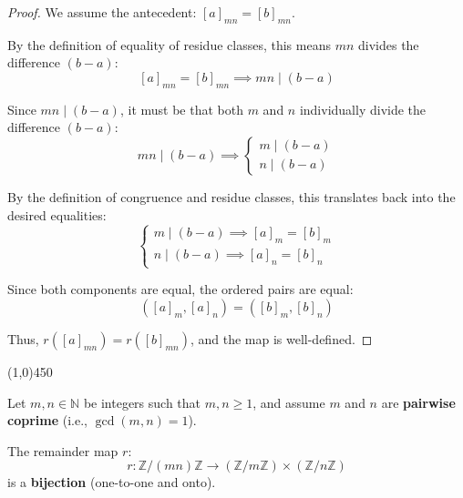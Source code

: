 \begin{proof}
    We assume the antecedent: $[a]_{mn} = [b]_{mn}$.
    
    By the definition of equality of residue classes, this means $mn$ divides the difference $(b - a)$:
    $$[a]_{mn} = [b]_{mn} \implies mn \mid (b - a)$$
    
    Since $mn \mid (b - a)$, it must be that both $m$ and $n$ individually divide the difference $(b - a)$:
    $$mn \mid (b - a) \implies \begin{cases} m \mid (b - a) \\ n \mid (b - a) \end{cases}$$
    
    By the definition of congruence and residue classes, this translates back into the desired equalities:
    $$\begin{cases} m \mid (b - a) \implies [a]_m = [b]_m \\ n \mid (b - a) \implies [a]_n = [b]_n \end{cases}$$
    
    Since both components are equal, the ordered pairs are equal:
    $$([a]_m, [a]_n) = ([b]_m, [b]_n)$$
    
    Thus, $r([a]_{mn}) = r([b]_{mn})$, and the map is well-defined.
\end{proof}

\begin{center}
    \vspace{10pt}
    \line(1,0){450}
    \vspace{25pt}
\end{center}


\begin{theorem}
    Let $m, n \in \mathbb{N}$ be integers such that $m, n \ge 1$, and assume $m$ and $n$ are \textbf{pairwise coprime} (i.e., $\gcd(m, n) = 1$).
    
    The remainder map $r$:
    $$r: \mathbb{Z}/(mn)\mathbb{Z} \longrightarrow (\mathbb{Z}/m\mathbb{Z}) \times (\mathbb{Z}/n\mathbb{Z})$$
    is a \textbf{bijection} (one-to-one and onto).
\end{theorem}

